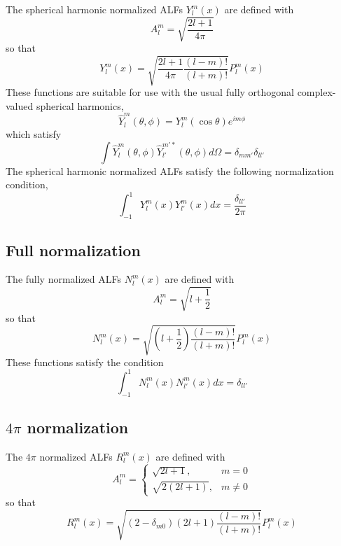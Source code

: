\documentclass[12pt]{article}
\begin{document}
The spherical harmonic normalized ALFs $Y_l^m(x)$ are defined with
\begin{equation}
A_l^m = \sqrt{\frac{2l+1}{4 \pi}}
\end{equation}
so that
\begin{equation}
Y_l^m(x) = \sqrt{\frac{2l+1}{4\pi} \frac{(l-m)!}{(l+m)!}} P_l^m(x)
\end{equation}
These functions are suitable for use with the usual fully orthogonal
complex-valued spherical harmonics,
\begin{equation}
\hat{Y}_l^m(\theta,\phi) = Y_l^m(\cos{\theta}) e^{i m \phi}
\end{equation}
which satisfy
\begin{equation}
\int \hat{Y}_l^m(\theta,\phi) \hat{Y}_{l'}^{m'*}(\theta,\phi) d\Omega = \delta_{mm'} \delta_{ll'}
\end{equation}
The spherical harmonic normalized ALFs satisfy the following normalization
condition,
\begin{equation}
\int_{-1}^1 Y_l^m(x) Y_{l'}^m(x) dx = \frac{\delta_{ll'}}{2\pi}
\end{equation}

\subsection{Full normalization}

The fully normalized ALFs $N_l^m(x)$ are defined with
\begin{equation}
A_l^m = \sqrt{l + \frac{1}{2}}
\end{equation}
so that
\begin{equation}
N_l^m(x) = \sqrt{\left(l + \frac{1}{2} \right) \frac{(l-m)!}{(l+m)!}} P_l^m(x)
\end{equation}
These functions satisfy the condition
\begin{equation}
\int_{-1}^1 N_l^m(x) N_{l'}^m(x) dx = \delta_{ll'}
\end{equation}

\subsection{$4\pi$ normalization}

The $4\pi$ normalized ALFs $R_l^m(x)$ are defined with
\begin{equation}
A_l^m = \left\{
\begin{array}{cc}
\sqrt{2l+1}, & m = 0 \\
\sqrt{2 (2l+1)}, & m \neq 0
\end{array}
\right.
\end{equation}
so that
\begin{equation}
R_l^m(x) = \sqrt{\left( 2 - \delta_{m0} \right) \left( 2l + 1 \right) \frac{(l-m)!}{(l+m)!}} P_l^m(x)
\end{equation}
\end{document}
